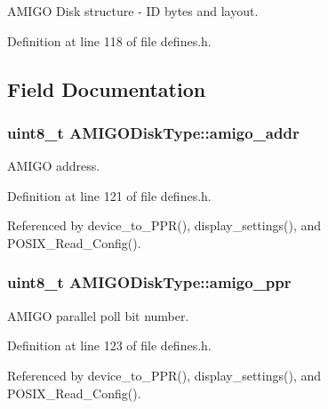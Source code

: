 A\+M\+I\+GO Disk structure -\/ ID bytes and layout. 

Definition at line 118 of file defines.\+h.



\subsection{Field Documentation}
\subsubsection[{\texorpdfstring{amigo\+\_\+addr}{amigo_addr}}]{\setlength{\rightskip}{0pt plus 5cm}uint8\+\_\+t A\+M\+I\+G\+O\+Disk\+Type\+::amigo\+\_\+addr}\hypertarget{structAMIGODiskType_a83024d746078dbf1b35e63fa38b9185c}{}\label{structAMIGODiskType_a83024d746078dbf1b35e63fa38b9185c}


A\+M\+I\+GO address. 



Definition at line 121 of file defines.\+h.



Referenced by device\+\_\+to\+\_\+\+P\+P\+R(), display\+\_\+settings(), and P\+O\+S\+I\+X\+\_\+\+Read\+\_\+\+Config().

\subsubsection[{\texorpdfstring{amigo\+\_\+ppr}{amigo_ppr}}]{\setlength{\rightskip}{0pt plus 5cm}uint8\+\_\+t A\+M\+I\+G\+O\+Disk\+Type\+::amigo\+\_\+ppr}\hypertarget{structAMIGODiskType_abf1e4513e84f8f4598577e20151f1e2d}{}\label{structAMIGODiskType_abf1e4513e84f8f4598577e20151f1e2d}


A\+M\+I\+GO parallel poll bit number. 



Definition at line 123 of file defines.\+h.



Referenced by device\+\_\+to\+\_\+\+P\+P\+R(), display\+\_\+settings(), and P\+O\+S\+I\+X\+\_\+\+Read\+\_\+\+Config().

